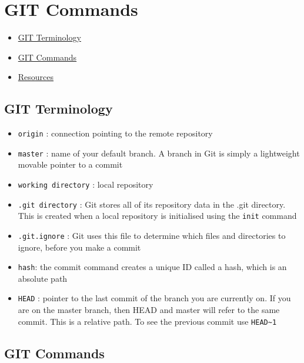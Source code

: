\documentclass[]{book}
\providecommand{\tightlist}{%
  \setlength{\itemsep}{0pt}\setlength{\parskip}{0pt}}
\begin{document}
\hypertarget{git-commands}{%
\chapter{GIT Commands}\label{git-commands}}

\begin{itemize}
\tightlist
\item
  \protect\hyperlink{git-terminology}{GIT Terminology}
\item
  \protect\hyperlink{git-commands}{GIT Commands}
\item
  \protect\hyperlink{resources}{Resources}
\end{itemize}

\hypertarget{git-terminology}{%
\section{GIT Terminology}\label{git-terminology}}

\begin{itemize}
\item
  \texttt{origin} : connection pointing to the remote repository
\item
  \texttt{master} : name of your default branch. A branch in Git is simply a lightweight movable pointer to a commit
\item
  \texttt{working\ directory} : local repository
\item
  \texttt{.git\ directory} : Git stores all of its repository data in the .git directory. This is created when a local repository is initialised using the \texttt{init} command
\item
  \texttt{.git.ignore} : Git uses this file to determine which files and directories to ignore, before you make a commit
\item
  \texttt{hash}: the commit command creates a unique ID called a hash, which is an absolute path
\item
  \texttt{HEAD} : pointer to the last commit of the branch you are currently on. If you are on the master branch, then HEAD and master will refer to the same commit. This is a relative path. To see the previous commit use \texttt{HEAD\textasciitilde{}1}
\end{itemize}

\hypertarget{git-commands-1}{%
\section{GIT Commands}\label{git-commands-1}}
\end{document}
